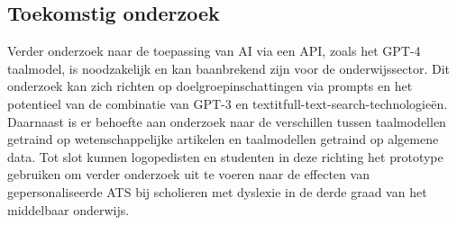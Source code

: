 \documentclass[a0,portrait]{hogent-poster}
\begin{document}
\begin{multicols}{2}
\section{Toekomstig onderzoek}
Verder onderzoek naar de toepassing van AI via een API, zoals het GPT-4 taalmodel, is noodzakelijk en kan baanbrekend zijn voor de onderwijssector. Dit onderzoek kan zich richten op doelgroepinschattingen via prompts en het potentieel van de combinatie van GPT-3 en textit{full-text-search}-technologieën. Daarnaast is er behoefte aan onderzoek naar de verschillen tussen taalmodellen getraind op wetenschappelijke artikelen en taalmodellen getraind op algemene data. Tot slot kunnen logopedisten en studenten in deze richting het prototype gebruiken om verder onderzoek uit te voeren naar de effecten van gepersonaliseerde ATS bij scholieren met dyslexie in de derde graad van het middelbaar onderwijs. 

\end{multicols}
\end{document}

